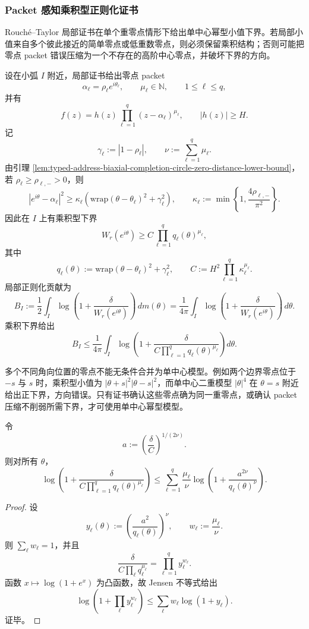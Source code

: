 \subsubsection{Packet 感知乘积型正则化证书}\label{subsubsec:typed-address-biaxial-completion-packet-aware-regularization-certificate}
Rouch\'e--Taylor 局部证书在单个重零点情形下给出单中心幂型小值下界。若局部小值来自多个彼此接近的简单零点或低重数零点，则必须保留乘积结构；否则可能把零点 packet 错误压缩为一个不存在的高阶中心零点，并破坏下界的方向。

设在小弧 \(I\) 附近，局部证书给出零点 packet
\[
\alpha_\ell=\rho_\ell e^{i\theta_\ell},
\qquad
\mu_\ell\in\mathbb{N},
\qquad
1\le\ell\le q,
\]
并有
\[
f(z)=h(z)\prod_{\ell=1}^q(z-\alpha_\ell)^{\mu_\ell},
\qquad
|h(z)|\ge H.
\]
记
\[
\gamma_\ell:=|1-\rho_\ell|,
\qquad
\nu:=\sum_{\ell=1}^q\mu_\ell.
\]
由引理 \ref{lem:typed-address-biaxial-completion-circle-zero-distance-lower-bound}，若 \(\rho_\ell\ge\rho_{\ell,-}>0\)，则
\[
|e^{i\theta}-\alpha_\ell|^2
\ge
\kappa_\ell
\left(
\mathrm{wrap}(\theta-\theta_\ell)^2+\gamma_\ell^2
\right),
\qquad
\kappa_\ell:=
\min\left\{1,\frac{4\rho_{\ell,-}}{\pi^2}\right\}.
\]
因此在 \(I\) 上有乘积型下界
\[
W_r(e^{i\theta})
\ge
C
\prod_{\ell=1}^q
q_\ell(\theta)^{\mu_\ell},
\]
其中
\[
q_\ell(\theta):=
\mathrm{wrap}(\theta-\theta_\ell)^2+\gamma_\ell^2,
\qquad
C:=
H^2\prod_{\ell=1}^q\kappa_\ell^{\mu_\ell}.
\]
局部正则化贡献为
\[
B_I
:=
\frac12\int_I
\log\left(1+\frac{\delta}{W_r(e^{i\theta})}\right)\,dm(\theta)
=
\frac1{4\pi}
\int_I
\log\left(1+\frac{\delta}{W_r(e^{i\theta})}\right)\,d\theta.
\]
乘积下界给出
\[
B_I
\le
\frac1{4\pi}
\int_I
\log\left(
1+
\frac{\delta}{
C\prod_{\ell=1}^q q_\ell(\theta)^{\mu_\ell}
}
\right)d\theta.
\]

多个不同角向位置的零点不能无条件合并为单中心模型。例如两个边界零点位于 \(-s\) 与 \(s\) 时，乘积型小值为 \(|\theta+s|^2|\theta-s|^2\)，而单中心二重模型 \(|\theta|^4\) 在 \(\theta=s\) 附近给出正下界，方向错误。只有证书确认这些零点确为同一重零点，或确认 packet 压缩不削弱所需下界，才可使用单中心幂型模型。

\begin{lemma}\label{lem:typed-address-biaxial-completion-packet-holder-reduction}
令
\[
a:=
\left(\frac{\delta}{C}\right)^{1/(2\nu)}.
\]
则对所有 \(\theta\)，
\[
\log\left(
1+
\frac{\delta}{
C\prod_{\ell=1}^q q_\ell(\theta)^{\mu_\ell}
}
\right)
\le
\sum_{\ell=1}^q
\frac{\mu_\ell}{\nu}
\log\left(
1+
\frac{a^{2\nu}}{q_\ell(\theta)^\nu}
\right).
\]
\end{lemma}
\begin{proof}
设
\[
y_\ell(\theta):=
\left(\frac{a^2}{q_\ell(\theta)}\right)^\nu,
\qquad
w_\ell:=\frac{\mu_\ell}{\nu}.
\]
则 \(\sum_\ell w_\ell=1\)，并且
\[
\frac{\delta}{C\prod_\ell q_\ell^{\mu_\ell}}
=
\prod_{\ell=1}^q y_\ell^{w_\ell}.
\]
函数 \(x\mapsto\log(1+e^x)\) 为凸函数，故 Jensen 不等式给出
\[
\log\left(1+\prod_\ell y_\ell^{w_\ell}\right)
\le
\sum_\ell w_\ell\log(1+y_\ell).
\]
证毕。
\end{proof}

